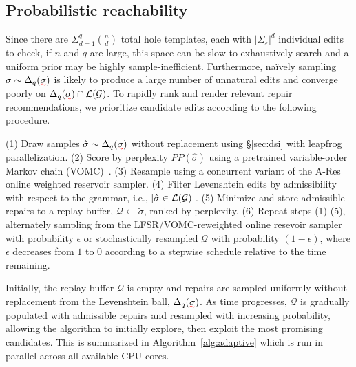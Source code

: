 \documentclass[sigplan,review,anonymous,acmsmall]{acmart}\settopmatter{printfolios=false,printccs=false,printacmref=false}
\begin{document}
  \subsection{Probabilistic reachability}\label{sec:adaptive}

  Since there are $\Sigma_{d=1}^q{n \choose d}$ total hole templates, each with $|\Sigma_\varepsilon| ^d$ individual edits to check, if $n$ and $q$ are large, this space can be slow to exhaustively search and a uniform prior may be highly sample-inefficient. Furthermore, na\"ively sampling $\sigma\sim\Delta_{q}(\err{\sigma})$ is likely to produce a large number of unnatural edits and converge poorly on $\Delta_{q}(\err{\sigma})\cap\mathcal{L}(\mathcal{G})$. To rapidly rank and render relevant repair recommendations, we prioritize candidate edits according to the following procedure.

  (1) Draw samples $\hat\sigma \sim \Delta_q(\err{\sigma})$ without replacement using \S\ref{sec:dsi} with leapfrog parallelization. (2) Score by perplexity $PP(\hat\sigma)$ using a pretrained variable-order Markov chain (VOMC)~\cite{schulz2008vomc}. (3) Resample using a concurrent variant of the A-Res~\cite{efraimidis2015weighted} online weighted reservoir sampler. (4) Filter Levenshtein edits by admissibility with respect to the grammar, i.e., $[\hat\sigma \in \mathcal{L}\vspace{2pt}(\mathcal{G})]$.
  (5) Minimize and store admissible repairs to a replay buffer, $\mathcal{Q} \leftarrow \tilde\sigma$, ranked by perplexity. (6) Repeat steps (1)-(5), alternately sampling from the LFSR/VOMC-reweighted online resevoir sampler with probability $\epsilon$ or stochastically resampled $\mathcal{Q}$ with probability $(1-\epsilon)$, where $\epsilon$ decreases from $1$ to $0$ according to a stepwise schedule relative to the time remaining.

  Initially, the replay buffer $\mathcal{Q}$ is empty and repairs are sampled uniformly without replacement from the Levenshtein ball, $\Delta_{q}(\err{\sigma})$. As time progresses, $\mathcal{Q}$  is gradually populated with admissible repairs and resampled with increasing probability, allowing the algorithm to initially explore, then exploit the most promising candidates. This is summarized in Algorithm~\ref{alg:adaptive} which is run in parallel across all available CPU cores.

  \begin{figure}[H]
    \vspace{-10pt}
    \begin{minipage}{\textwidth}
      
    \end{minipage}
  \end{figure}
\end{document}
